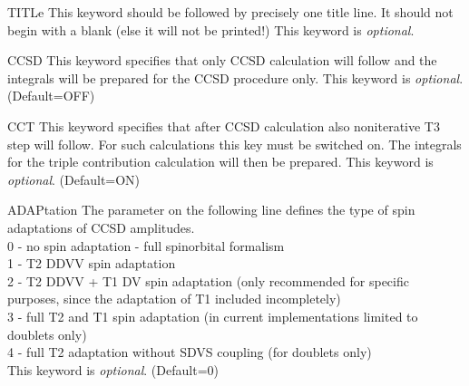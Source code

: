 \begin{keywordlist}
\item[TITLe]
This keyword should be followed by precisely one title line.
It should not begin with a blank (else it will not be printed!)
This keyword is {\it optional}.
\item[CCSD]
This keyword specifies that only CCSD calculation will follow
and the integrals will be prepared for the CCSD procedure only.
This keyword is {\it optional}. (Default=OFF)
\item[CCT]
This keyword specifies that after CCSD calculation also noniterative
T3 step will follow. For such calculations this key must
be switched on. The integrals for the triple contribution calculation
will then be prepared.
This keyword is {\it optional}. (Default=ON)
\item[ADAPtation]
The parameter on the following line defines the type of spin adaptations
of CCSD amplitudes.\\
0 - no spin adaptation - full spinorbital formalism\\
1 - T2 DDVV spin adaptation\\
2 - T2 DDVV + T1 DV spin adaptation (only recommended for specific purposes,
since the adaptation of T1 included  incompletely)\\
3 - full T2 and T1 spin adaptation (in current implementations
                  limited to doublets only)\\
4 - full T2 adaptation without SDVS coupling (for doublets only)\\
This keyword is {\it optional}. (Default=0)

\end{keywordlist}
